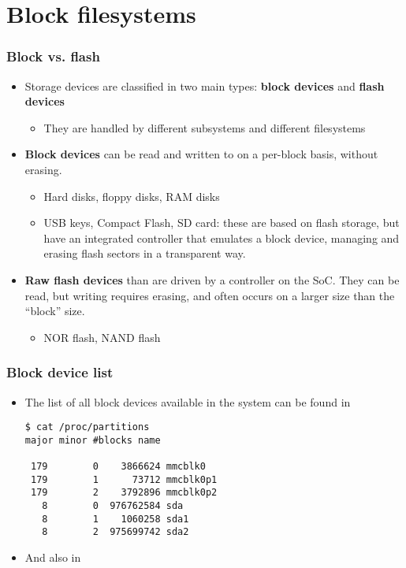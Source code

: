 \section{Block filesystems}

\begin{frame}
  \frametitle{Block vs. flash}
  \begin{itemize}
  \item Storage devices are classified in two main types: {\bf block
      devices} and {\bf flash devices}
    \begin{itemize}
    \item They are handled by different subsystems and different
      filesystems
    \end{itemize}
  \item {\bf Block devices} can be read and written to on a per-block
    basis, without erasing.
    \begin{itemize}
    \item Hard disks, floppy disks, RAM disks
    \item USB keys, Compact Flash, SD card: these are based on
      flash storage, but have an integrated controller that emulates a block
      device, managing and erasing flash sectors in a transparent way.
    \end{itemize}
  \item {\bf Raw flash devices} than are driven by a controller on the
      SoC. They can be read, but writing requires erasing, and often occurs
      on a larger size than the “block” size.
    \begin{itemize}
    \item NOR flash, NAND flash
    \end{itemize}
  \end{itemize}
\end{frame}

\begin{frame}[fragile]
  \frametitle{Block device list}
  \begin{itemize}
  \item The list of all block devices available in the system can be
    found in \\
\begin{verbatim}
$ cat /proc/partitions
major minor #blocks name

 179        0    3866624 mmcblk0
 179        1      73712 mmcblk0p1
 179        2    3792896 mmcblk0p2
   8        0  976762584 sda
   8        1    1060258 sda1
   8        2  975699742 sda2
\end{verbatim}
  \item And also in 
  \end{itemize}
\end{frame}

